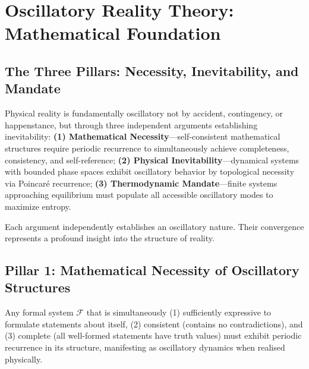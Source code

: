 \documentclass[11pt,onecolumn]{article}
\begin{document}
\section{Oscillatory Reality Theory: Mathematical Foundation}

\subsection{The Three Pillars: Necessity, Inevitability, and Mandate}

Physical reality is fundamentally oscillatory not by accident, contingency, or happenstance, but through three independent arguments establishing inevitability: \textbf{(1) Mathematical Necessity}---self-consistent mathematical structures require periodic recurrence to simultaneously achieve completeness, consistency, and self-reference; \textbf{(2) Physical Inevitability}---dynamical systems with bounded phase spaces exhibit oscillatory behavior by topological necessity via Poincar\'e recurrence; \textbf{(3) Thermodynamic Mandate}---finite systems approaching equilibrium must populate all accessible oscillatory modes to maximize entropy.

Each argument independently establishes an oscillatory nature. Their convergence represents a profound insight into the structure of reality.

\subsection{Pillar 1: Mathematical Necessity of Oscillatory Structures}

\begin{theorem}
\label{thm:math_necessity}
Any formal system $\mathcal{F}$ that is simultaneously \textup{(1)} sufficiently expressive to formulate statements about itself, \textup{(2)} consistent (contains no contradictions), and \textup{(3)} complete (all well-formed statements have truth values) must exhibit periodic recurrence in its structure, manifesting as oscillatory dynamics when realised physically.
\end{theorem}
\end{document}
